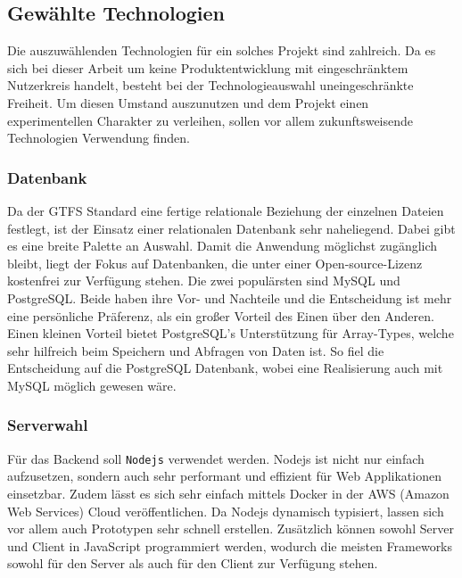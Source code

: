 \subsection{Gewählte Technologien}
\label{ssub:gewählte_technologien}
  Die auszuwählenden Technologien für ein solches Projekt sind zahlreich. Da es sich bei dieser Arbeit um keine Produktentwicklung mit eingeschränktem Nutzerkreis handelt, besteht bei der Technologieauswahl uneingeschränkte Freiheit. Um diesen Umstand auszunutzen und dem Projekt einen experimentellen Charakter zu verleihen, sollen vor allem zukunftsweisende Technologien Verwendung finden.
  
  \subsubsection{Datenbank}
  \label{ssub:datenbank}
    Da der GTFS Standard eine fertige relationale Beziehung der einzelnen Dateien festlegt, ist der Einsatz einer relationalen Datenbank sehr naheliegend. Dabei gibt es eine breite Palette an Auswahl. Damit die Anwendung möglichst zugänglich bleibt, liegt der Fokus auf Datenbanken, die unter einer Open-source-Lizenz kostenfrei zur Verfügung stehen. Die zwei populärsten sind MySQL und PostgreSQL\parencite{db_engines}. Beide haben ihre Vor- und Nachteile und die Entscheidung ist mehr eine persönliche Präferenz, als ein großer Vorteil des Einen über den Anderen. Einen kleinen Vorteil bietet PostgreSQL's Unterstützung für Array-Types, welche sehr hilfreich beim Speichern und Abfragen von Daten ist. So fiel die Entscheidung auf die PostgreSQL Datenbank, wobei eine Realisierung auch mit MySQL möglich gewesen wäre.

  \subsubsection{Serverwahl}
  \label{ssub:serverwahl}
    Für das Backend soll \texttt{Nodejs} verwendet werden. Nodejs ist nicht nur einfach aufzusetzen, sondern auch sehr performant und effizient für Web Applikationen einsetzbar. Zudem lässt es sich sehr einfach mittels Docker in der AWS (Amazon Web Services) Cloud veröffentlichen. Da Nodejs dynamisch typisiert, lassen sich vor allem auch Prototypen sehr schnell erstellen. Zusätzlich können sowohl Server und Client in JavaScript programmiert werden, wodurch die meisten Frameworks sowohl für den Server als auch für den Client zur Verfügung stehen.
  
